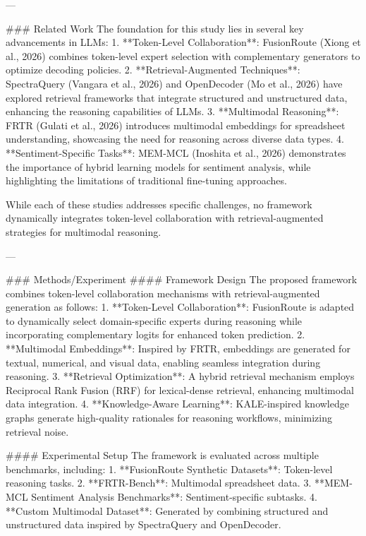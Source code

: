 ---

### Related Work  
The foundation for this study lies in several key advancements in LLMs:  
1. **Token-Level Collaboration**: FusionRoute (Xiong et al., 2026) combines token-level expert selection with complementary generators to optimize decoding policies.  
2. **Retrieval-Augmented Techniques**: SpectraQuery (Vangara et al., 2026) and OpenDecoder (Mo et al., 2026) have explored retrieval frameworks that integrate structured and unstructured data, enhancing the reasoning capabilities of LLMs.  
3. **Multimodal Reasoning**: FRTR (Gulati et al., 2026) introduces multimodal embeddings for spreadsheet understanding, showcasing the need for reasoning across diverse data types.  
4. **Sentiment-Specific Tasks**: MEM-MCL (Inoshita et al., 2026) demonstrates the importance of hybrid learning models for sentiment analysis, while highlighting the limitations of traditional fine-tuning approaches.  

While each of these studies addresses specific challenges, no framework dynamically integrates token-level collaboration with retrieval-augmented strategies for multimodal reasoning.

---

### Methods/Experiment  
#### Framework Design  
The proposed framework combines token-level collaboration mechanisms with retrieval-augmented generation as follows:  
1. **Token-Level Collaboration**: FusionRoute is adapted to dynamically select domain-specific experts during reasoning while incorporating complementary logits for enhanced token prediction.  
2. **Multimodal Embeddings**: Inspired by FRTR, embeddings are generated for textual, numerical, and visual data, enabling seamless integration during reasoning.  
3. **Retrieval Optimization**: A hybrid retrieval mechanism employs Reciprocal Rank Fusion (RRF) for lexical-dense retrieval, enhancing multimodal data integration.  
4. **Knowledge-Aware Learning**: KALE-inspired knowledge graphs generate high-quality rationales for reasoning workflows, minimizing retrieval noise.

#### Experimental Setup  
The framework is evaluated across multiple benchmarks, including:  
1. **FusionRoute Synthetic Datasets**: Token-level reasoning tasks.  
2. **FRTR-Bench**: Multimodal spreadsheet data.  
3. **MEM-MCL Sentiment Analysis Benchmarks**: Sentiment-specific subtasks.  
4. **Custom Multimodal Dataset**: Generated by combining structured and unstructured data inspired by SpectraQuery and OpenDecoder.


